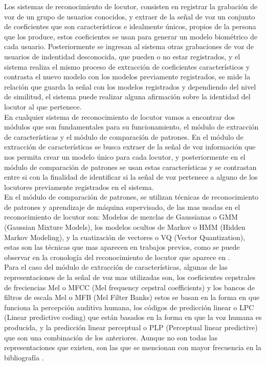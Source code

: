 Los sistemas de reconocimiento de locutor, consisten en registrar la grabaci\'on de voz de un grupo de usuarios conocidos, y extraer de la señal de voz un conjunto de coeficientes que son caracter\'isticos e idealmente \'unicos, propios de la persona que los produce, estos coeficientes se usan para generar un modelo biom\'etrico de cada usuario. Posteriormente se ingresan al sistema otras grabaciones de voz de usuarios de indentidad desconocida, que pueden o no estar registrados, y el sistema realiza el mismo proceso de extracci\'on de coeficientes caracter\'isticos y contrasta el nuevo modelo con los modelos previamente registrados, se mide la relaci\'on que guarda la señal con los modelos registrados y dependiendo del nivel de similitud, el sistema puede realizar alguna afirmaci\'on sobre la identidad del locutor al que pertenece.\\ 

En cualquier sistema de reconocimiento de locutor vamos a encontrar dos m\'odulos que son fundamentales para su funcionamiento, el m\'odulo de extracci\'on de caracter\'isticas y el m\'odulo de comparaci\'on de patrones. En el m\'odulo de extracci\'on de caracter\'isticas se busca extraer de la señal de voz informaci\'on que nos permita crear un modelo \'unico para cada locutor, y posteriormente en el m\'odulo de comparaci\'on de patrones se usan estas caracter\'isticas y se contrastan entre si con la finalidad de identificar si la señal de voz pertenece a alguno de los locutores previamente registrados en el sistema.\\

En el m\'odulo de comparaci\'on de patrones, se utilizan t\'ecnicas de reconocimiento de patrones y aprendizaje de m\'aquina supervisado, de las mas usadas en el reconocimiento de locutor son: Modelos de mezclas de Gaussianas o GMM (Gaussian Mixture Models), los modelos ocultos de Markov o HMM (Hidden Markov Modeling), y la cuatizaci\'on de vectores o VQ (Vector Quantization), estas son las t\'ecnicas que mas aparecen en trabajos previos, como se puede observar en la cronolog\'ia del reconocimiento de locutor que aparece en \cite{campbell1997}.\\

Para el caso del m\'odulo de extracci\'on de caracter\'isticas, algunas de las representaciones de la señal de voz mas utilizadas son, los coeficientes cepstrales de freciencias Mel o MFCC (Mel frequency cepstral coefficients) y los bancos de filtros de escala Mel o MFB (Mel Filter Banks) estos se basan en la forma en que funciona la percepci\'on auditiva humana, los c\'odigos de predicci\'on linear o LPC (Linear predictive coding) que est\'an basados en la forma en que la voz humana es producida, y la predicci\'on linear perceptual o  PLP (Perceptual linear predictive) que son una combinaci\'on de los anteriores. Aunque no son todas las representaciones que existen, son las que se mencionan con mayor frecuencia en la bibliograf\'ia \cite{beigi2011}.\\

